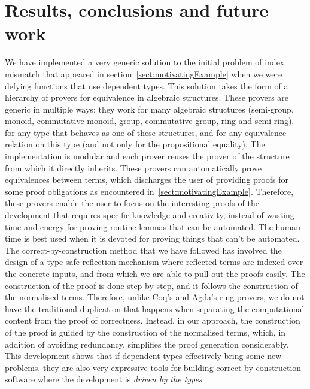 \section{Results, conclusions and future work}

We have implemented a very generic solution to the initial problem of index mismatch that appeared in section~\ref{sect:motivatingExample} when we were defying functions that use dependent types. This solution takes the form of a hierarchy of provers for equivalence in algebraic structures. These provers are generic in multiple ways: they work for many algebraic structures (semi-group, monoid, commutative monoid, group, commutative group, ring and semi-ring), for any type that behaves as one of these structures, and for any equivalence relation on this type (and not only for the propositional equality). The implementation is modular and each prover reuses the prover of the structure from which it directly inherits. These provers can automatically prove equivalences between terms, which discharges the user of providing proofs for some proof obligations as  encountered in~\ref{sect:motivatingExample}. Therefore, these provers enable the user to focus on the interesting proofs of the development that requires specific knowledge and creativity, instead of wasting time and energy for proving routine lemmas that can be automated. The human time is best used when it is devoted for proving things that can't be automated. \\

The correct-by-construction method that we have followed has involved the design of a type-safe reflection mechanism where reflected terms are indexed over the concrete inputs, and from which we are able to pull out the proofs easily. The construction of the proof is done step by step, and it follows the construction of the normalised terms. Therefore, unlike Coq's and Agda's ring provers, we do not have the traditional duplication that happens when separating the computational content from the proof of correctness. Instead, in our approach, the construction of the proof is guided by the construction of the normalised terms, which, in addition of avoiding redundancy, simplifies the proof generation considerably. This development shows that if dependent types effectively bring some new problems, they are also very expressive tools for building correct-by-construction software where the development is \emph{driven by the types}. \\

